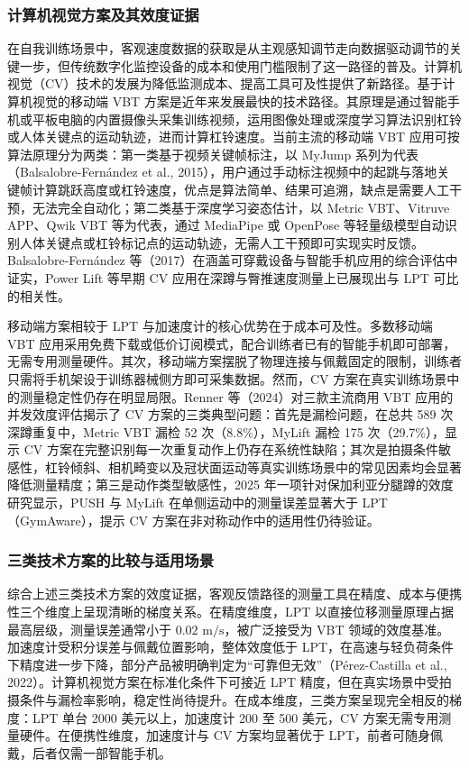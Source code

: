 \documentclass[UTF8,zihao=-4,twoside,openany]{ctexbook}
\begin{document}
\subsubsection{计算机视觉方案及其效度证据}
在自我训练场景中，客观速度数据的获取是从主观感知调节走向数据驱动调节的关键一步，但传统数字化监控设备的成本和使用门槛限制了这一路径的普及。计算机视觉（CV）技术的发展为降低监测成本、提高工具可及性提供了新路径。基于计算机视觉的移动端 VBT 方案是近年来发展最快的技术路径。其原理是通过智能手机或平板电脑的内置摄像头采集训练视频，运用图像处理或深度学习算法识别杠铃或人体关键点的运动轨迹，进而计算杠铃速度。当前主流的移动端 VBT 应用可按算法原理分为两类：第一类基于视频关键帧标注，以 MyJump 系列为代表（Balsalobre-Fernández et al., 2015），用户通过手动标注视频中的起跳与落地关键帧计算跳跃高度或杠铃速度，优点是算法简单、结果可追溯，缺点是需要人工干预，无法完全自动化；第二类基于深度学习姿态估计，以 Metric VBT、Vitruve APP、Qwik VBT 等为代表，通过 MediaPipe 或 OpenPose 等轻量级模型自动识别人体关键点或杠铃标记点的运动轨迹，无需人工干预即可实现实时反馈。Balsalobre-Fernández 等（2017）在涵盖可穿戴设备与智能手机应用的综合评估中证实，Power Lift 等早期 CV 应用在深蹲与臀推速度测量上已展现出与 LPT 可比的相关性。

移动端方案相较于 LPT 与加速度计的核心优势在于成本可及性。多数移动端 VBT 应用采用免费下载或低价订阅模式，配合训练者已有的智能手机即可部署，无需专用测量硬件。其次，移动端方案摆脱了物理连接与佩戴固定的限制，训练者只需将手机架设于训练器械侧方即可采集数据。然而，CV 方案在真实训练场景中的测量稳定性仍存在明显局限。Renner 等（2024）对三款主流商用 VBT 应用的并发效度评估揭示了 CV 方案的三类典型问题：首先是漏检问题，在总共 589 次深蹲重复中，Metric VBT 漏检 52 次（8.8\%），MyLift 漏检 175 次（29.7\%），显示 CV 方案在完整识别每一次重复动作上仍存在系统性缺陷；其次是拍摄条件敏感性，杠铃倾斜、相机畸变以及冠状面运动等真实训练场景中的常见因素均会显著降低测量精度；第三是动作类型敏感性，2025 年一项针对保加利亚分腿蹲的效度研究显示，PUSH 与 MyLift 在单侧运动中的测量误差显著大于 LPT（GymAware），提示 CV 方案在非对称动作中的适用性仍待验证。

\subsubsection{三类技术方案的比较与适用场景}
综合上述三类技术方案的效度证据，客观反馈路径的测量工具在精度、成本与便携性三个维度上呈现清晰的梯度关系。在精度维度，LPT 以直接位移测量原理占据最高层级，测量误差通常小于 $0.02\text{ m/s}$，被广泛接受为 VBT 领域的效度基准。加速度计受积分误差与佩戴位置影响，整体效度低于 LPT，在高速与轻负荷条件下精度进一步下降，部分产品被明确判定为“可靠但无效”（Pérez-Castilla et al., 2022）。计算机视觉方案在标准化条件下可接近 LPT 精度，但在真实场景中受拍摄条件与漏检率影响，稳定性尚待提升。在成本维度，三类方案呈现完全相反的梯度：LPT 单台 2000 美元以上，加速度计 200 至 500 美元，CV 方案无需专用测量硬件。在便携性维度，加速度计与 CV 方案均显著优于 LPT，前者可随身佩戴，后者仅需一部智能手机。
\end{document}
